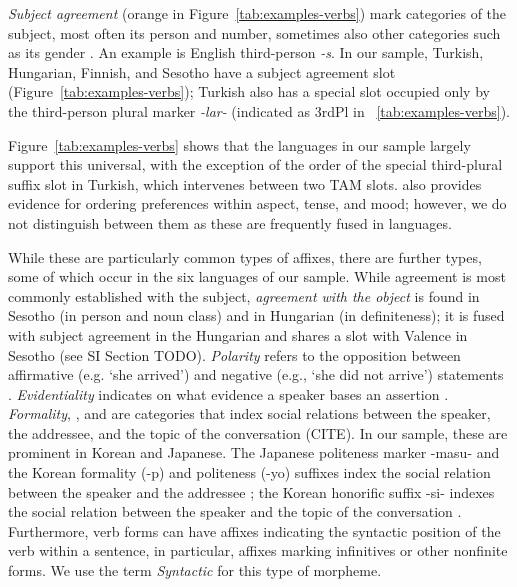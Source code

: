 \documentclass[11pt,letterpaper]{article}
\newcommand{\citep}{\parencite}
\newcommand{\citet}{\Textcite}
\newcounter{def}
\begin{document}
\textit{Subject agreement} (orange in Figure~\ref{tab:examples-verbs}) mark categories of the subject, most often its person and number, sometimes also other categories such as its gender \citep{corbett2003agreement}.
An example is English third-person \textit{-s}.
In our sample, Turkish, Hungarian, Finnish, and Sesotho have a subject agreement slot (Figure~\ref{tab:examples-verbs}); Turkish also has a special slot occupied only by the third-person plural marker \textit{-lar-} (indicated as 3rdPl in ~\ref{tab:examples-verbs}).



Figure~\ref{tab:examples-verbs} shows that the languages in our sample largely support this universal, with the exception of the order of the special third-plural suffix slot in Turkish, which intervenes between two TAM slots.
\citet{bybee-morphology-1985} also provides evidence for ordering preferences within aspect, tense, and mood; however, we do not distinguish between them as these are frequently fused in languages.


While these are particularly common types of affixes, there are further types, some of which occur in the six languages of our sample.
While agreement is most commonly established with the subject, \textit{agreement with the object} is found in Sesotho \citep{doke1967textbook} (in person and noun class) and in Hungarian \citep{rounds2001hungarian} (in definiteness); it is fused with subject agreement in the Hungarian and shares a slot with Valence in Sesotho (see SI Section TODO).
\textit{Polarity} refers to the opposition between affirmative (e.g. `she arrived') and negative  (e.g., `she did not arrive') statements \citep{wals-112}.
\textit{Evidentiality} indicates on what evidence a speaker bases an assertion \citep{aikhenvald2003evidentiality}.
\textit{Formality}, , and  are categories that index social relations between the speaker, the addressee, and the topic of the conversation (CITE).
In our sample, these are prominent in Korean and Japanese.
The Japanese politeness marker -masu- and the Korean formality (-p) and politeness (-yo) suffixes index the social relation between the speaker and the addressee \citep{hasegawa2014japanese, yeon2010korean}; the Korean honorific suffix -si- indexes the social relation between the speaker and the topic of the conversation \citep{yeon2010korean}.
Furthermore, verb forms can have affixes indicating the syntactic position of the verb within a sentence, in particular, affixes marking infinitives or other nonfinite forms.
We use the term \textit{Syntactic} for this type of morpheme.
\end{document}
